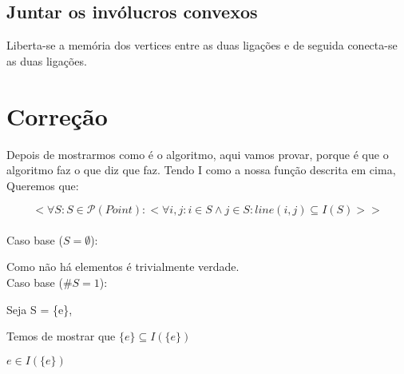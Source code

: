 \documentclass[11pt]{article}
\begin{document}
\subsection{ Juntar os invólucros convexos } 
Liberta-se a memória dos vertices entre as duas ligações e de seguida 
conecta-se as duas ligações.


\section{Correção}
Depois de mostrarmos como é o algoritmo,
aqui vamos provar, porque é que o algoritmo faz o que diz que faz.
Tendo I como a nossa função descrita em cima, Queremos que:

$$
< \forall S : S \in \mathcal{P}(Point) : 
        < \forall i,j : i \in S \wedge j \in S : 
            line(i,j) \subseteq I(S)
        >
>
$$\\
Caso base ($S = \emptyset $):\par
    Como não há elementos é trivialmente verdade.\\
Caso base ($\#S = 1$):\par
    Seja S = \{e\},\par
    Temos de mostrar que $\{e\} \subseteq I(\{e\})$\par
    $e \in I(\{e\})$\par
\end{document}
